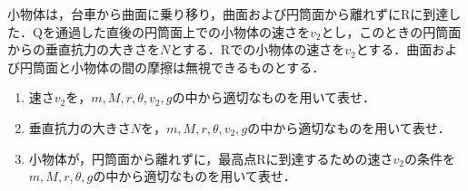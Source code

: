 小物体は，台車から曲面に乗り移り，曲面および円筒面から離れずにRに到達した．Qを通過した直後の円筒面上での小物体の速さを$v_2$とし，このときの円筒面からの垂直抗力の大きさを$N$とする．Rでの小物体の速さを$v_2$とする．曲面および円筒面と小物体の間の摩擦は無視できるものとする．
\begin{enumerate}[resume, label={\textbf{問\arabic*}}]
  \item {\hzw}速さ$v_2$を，$m, M, r, \theta, v_2, g$の中から適切なものを用いて表せ．
  \item {\hzw}垂直抗力の大きさ$N$を，$m, M, r, \theta, v_2, g$の中から適切なものを用いて表せ．
  \item {\hzw}小物体が，円筒面から離れずに，最高点Rに到達するための速さ$v_2$の条件を$m, M, r, \theta, g$の中から適切なものを用いて表せ．
\end{enumerate}
